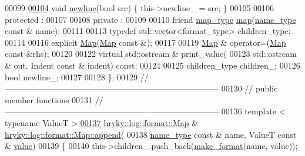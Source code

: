 \begin{DoxyCode}
00099 
\hypertarget{log__format__map_8h_source_l00104}{}\hyperlink{classhryky_1_1log_1_1format_1_1_map_a857d1ea2c99c677528658451b4e5518f}{00104}     \textcolor{keywordtype}{void} \hyperlink{classhryky_1_1log_1_1format_1_1_map_a857d1ea2c99c677528658451b4e5518f}{newline}(\textcolor{keywordtype}{bool} src) \{ this->newline\_ = src; \}
00105 
00106 \textcolor{keyword}{protected} :
00107 
00108 \textcolor{keyword}{private} :
00109 
00110     \textcolor{keyword}{friend} \hyperlink{classhryky_1_1_intrusive_ptr}{map_type} \hyperlink{classhryky_1_1log_1_1format_1_1_map_afa54cde058f8b7cc18099b6bcdbe6e72}{map}(\hyperlink{namespacehryky_1_1log_1_1format_ab7408d1e2ed2d648dbf9bba69eb74288}{name_type} \textcolor{keyword}{const} & name);
00111 
00113     \textcolor{keyword}{typedef} std::vector<format\_type> children\_type;
00114 
00116     \textcolor{keyword}{explicit} \hyperlink{classhryky_1_1log_1_1format_1_1_map_ae4eea925dd5bcc042862d6c07eddb037}{Map}(\hyperlink{classhryky_1_1log_1_1format_1_1_map}{Map} \textcolor{keyword}{const} &);
00117 
00119     \hyperlink{classhryky_1_1log_1_1format_1_1_map}{Map} & operator=(\hyperlink{classhryky_1_1log_1_1format_1_1_map}{Map} \textcolor{keyword}{const} &rhs);
00120 
00122     \textcolor{keyword}{virtual} std::ostream & print\_value(
00123         std::ostream & out, Indent \textcolor{keyword}{const} & indent) \textcolor{keyword}{const};
00124 
00125     children\_type           children\_;
00126     \textcolor{keywordtype}{bool}                    newline\_;
00127 
00128 \};
00129 \textcolor{comment}{//
      ------------------------------------------------------------------------------}
00130 \textcolor{comment}{// public member functions}
00131 \textcolor{comment}{//
      ------------------------------------------------------------------------------}
00136 \textcolor{comment}{}\textcolor{keyword}{template} < \textcolor{keyword}{typename} ValueT >
\hypertarget{log__format__map_8h_source_l00137}{}\hyperlink{classhryky_1_1log_1_1format_1_1_map_a61e7546016f71fcb47e9aaa2ac318264}{00137} \hyperlink{classhryky_1_1log_1_1format_1_1_map}{hryky::log::format::Map} & \hyperlink{classhryky_1_1log_1_1format_1_1_map_a4aa7b22bf43c8d2af7fc15ef0c676af4}{hryky::log::format::Map::append}(
00138     \hyperlink{namespacehryky_1_1log_1_1format_ab7408d1e2ed2d648dbf9bba69eb74288}{name_type} \textcolor{keyword}{const} & name, ValueT \textcolor{keyword}{const} & \hyperlink{namespacehryky_1_1log_1_1format_a5b9af9c1a7b018d54144acfb1b8cc960}{value})
00139 \{
00140     this->children\_.push\_back(\hyperlink{namespacehryky_1_1log_1_1format_ae8ca636c4b89fe300287aca4f870f2ef}{make_format}(name, value));

\end{DoxyCode}
